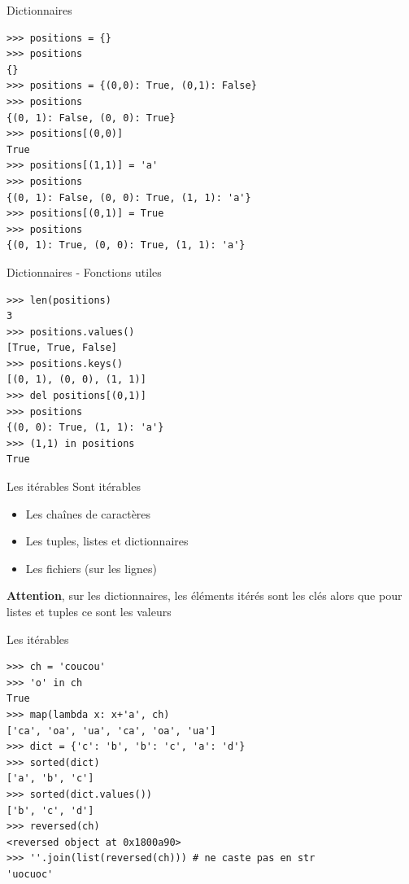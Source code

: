 \documentclass{beamer}
\begin{document}
\begin{frame}[fragile]{Dictionnaires}
\begin{lstlisting}
>>> positions = {}
>>> positions
{}
>>> positions = {(0,0): True, (0,1): False}
>>> positions
{(0, 1): False, (0, 0): True}
>>> positions[(0,0)]
True
>>> positions[(1,1)] = 'a'
>>> positions
{(0, 1): False, (0, 0): True, (1, 1): 'a'}
>>> positions[(0,1)] = True
>>> positions
{(0, 1): True, (0, 0): True, (1, 1): 'a'}
\end{lstlisting}
\end{frame}


\begin{frame}[fragile]{Dictionnaires - Fonctions utiles}
\begin{lstlisting}
>>> len(positions)
3
>>> positions.values()
[True, True, False]
>>> positions.keys()
[(0, 1), (0, 0), (1, 1)]
>>> del positions[(0,1)]
>>> positions
{(0, 0): True, (1, 1): 'a'}
>>> (1,1) in positions
True
\end{lstlisting}
\end{frame}


\begin{frame}[fragile]{Les itérables}
Sont itérables
\begin{itemize}
 \item Les chaînes de caractères
 \item Les tuples, listes et dictionnaires
 \item Les fichiers (sur les lignes)
\end{itemize}

\textbf{Attention}, sur les dictionnaires, les éléments itérés sont les clés alors que pour listes et tuples ce sont les valeurs

\end{frame}

\begin{frame}[fragile]{Les itérables}
\begin{lstlisting}
>>> ch = 'coucou'
>>> 'o' in ch
True
>>> map(lambda x: x+'a', ch)
['ca', 'oa', 'ua', 'ca', 'oa', 'ua']
>>> dict = {'c': 'b', 'b': 'c', 'a': 'd'}
>>> sorted(dict)
['a', 'b', 'c']
>>> sorted(dict.values())
['b', 'c', 'd']
>>> reversed(ch)
<reversed object at 0x1800a90>
>>> ''.join(list(reversed(ch))) # ne caste pas en str
'uocuoc'
\end{lstlisting}
\end{frame}

\end{document}
